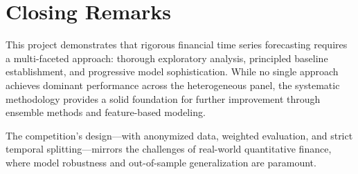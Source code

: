 \section{Closing Remarks}

This project demonstrates that rigorous financial time series forecasting requires a multi-faceted approach: thorough exploratory analysis, principled baseline establishment, and progressive model sophistication. While no single approach achieves dominant performance across the heterogeneous panel, the systematic methodology provides a solid foundation for further improvement through ensemble methods and feature-based modeling.

The competition's design---with anonymized data, weighted evaluation, and strict temporal splitting---mirrors the challenges of real-world quantitative finance, where model robustness and out-of-sample generalization are paramount.
